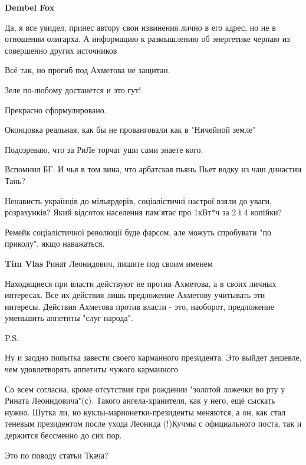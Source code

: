\begin{itemize}
\begin{itemize}
\textbf{Dembel Fox} 

Да, я все увидел, принес автору свои извинения лично в его адрес, но не в
отношении олигарха. А информацию к размышлению об энергетике черпаю из
совершенно других источников


\end{itemize} %

Всё так, но прогиб под Ахметова не защитан.

Зеле по-любому достанется и это гут!

Прекрасно сформулировано.

Оконцовка реальная, как бы не прованговали как в "Ничейной земле"

Подозреваю, что за РиЛе торчат уши сами знаете кого.

Вспомнил БГ:
И чья в том вина, что арбатская пьянь
Пьет водку из чаш династии Тань?


Ненависть українців до мільярдерів, соціалістичні настрої взяли до уваги,
розрахунків? Який відсоток населення пам'ятає про 1кВт*ч за 2 і 4 копійки?

Ремейк соціалістичної революції буде фарсом, але можуть спробувати "по
приколу", якщо наважаться.


\textbf{Tim Vlas} Ринат Леонидович, пишите под своим именем


Находящиеся при власти действуют не против Ахметова, а в своих личных
интересах. Все их действия лишь предложение Ахметову учитывать эти интересы.
Действия Ахметова против власти - это, наоборот, предложение уменьшить аппетиты
"слуг народа".

P.S.

Ну и заодно попытка завести своего карманного президента. Это выйдет дешевле,
чем удовлетворять аппетиты чужого карманного



Со всем согласна, кроме отсутствия при рождении "золотой ложечки во рту у
Рината Леонидовича"(с). Такого ангела-хранителя, как у него, ещё сыскать нужно.
Шутка ли, но куклы-марионетки-президенты меняются, а он, как стал теневым
президентом после ухода Леонида (!)Кучмы с официального поста, так и держится
бессменно до сих пор.

Это по поводу статьи Ткача?


\end{itemize}
